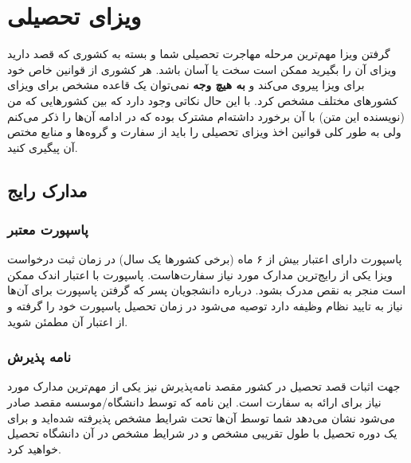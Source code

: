 \chapter{ویزای تحصیلی}
\label{ch:visa}
گرفتن ویزا مهم‌ترین مرحله مهاجرت تحصیلی شما و بسته به کشوری که قصد دارید ویزای آن را بگیرید 
ممکن است سخت یا آسان باشد. هر کشوری از قوانین خاص خود برای ویزا پیروی می‌کند و \textbf{به هیچ وجه} نمی‌توان یک 
قاعده مشخص برای ویزای کشور‌های مختلف مشخص کرد. با این حال نکاتی وجود دارد که بین کشور‌هایی که من (نویسنده این متن) با آن 
برخورد داشته‌ام مشترک بوده که در ادامه آن‌ها را ذکر می‌کنم ولی به طور کلی قوانین اخذ ویزای تحصیلی را 
باید از سفارت و گرو‌ه‌ها و منابع مختص آن پیگیری کنید.

\section{مدارک رایج}
\subsection{پاسپورت معتبر}
پاسپورت دارای اعتبار بیش از ۶ ماه (برخی کشور‌ها یک سال) در زمان ثبت درخواست ویزا یکی از رایج‌ترین مدارک مورد نیاز سفارت‌هاست. پاسپورت با 
اعتبار اندک ممکن است منجر به نقص مدرک بشود. درباره دانشجویان پسر که گرفتن پاسپورت برای آن‌ها نیاز به تایید نظام وظیفه دارد 
توصیه می‌شود در زمان تحصیل پاسپورت خود را گرفته و از اعتبار آن مطمئن شوید. 

\subsection{نامه پذیرش}
جهت اثبات قصد تحصیل در کشور مقصد نامه‌پذیرش نیز یکی از مهم‌ترین مدارک مورد نیاز برای ارائه به سفارت است. این نامه که توسط
دانشگاه/موسسه مقصد صادر می‌شود نشان می‌دهد شما توسط آن‌ها تحت شرایط مشخص پذیرفته شده‌اید و برای یک دوره تحصیل با طول تقریبی مشخص
و در شرایط مشخص در آن دانشگاه تحصیل خواهید کرد. 

